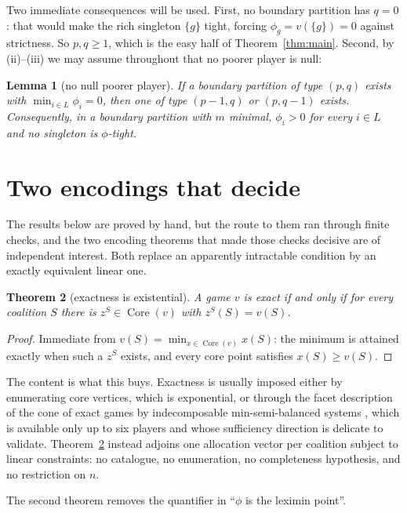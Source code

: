\documentclass[11pt]{article}
\newtheorem{theorem}{Theorem}
\newtheorem{lemma}[theorem]{Lemma}
\newcommand{\core}{\operatorname{Core}}
\begin{document}
Two immediate consequences will be used.  First, no boundary partition has
$q=0$: that would make the rich singleton $\{g\}$ tight, forcing
$\phi_g=v(\{g\})=0$ against strictness.  So $p,q\ge1$, which is the easy half
of Theorem~\ref{thm:main}.  Second, by (ii)--(iii) we may assume throughout
that no poorer player is null:

\begin{lemma}[no null poorer player]\label{lem:nonull}
If a boundary partition of type $(p,q)$ exists with $\min_{i\in L}\phi_i=0$,
then one of type $(p-1,q)$ or $(p,q-1)$ exists.  Consequently, in a boundary
partition with $m$ minimal, $\phi_i>0$ for every $i\in L$ and no singleton is
$\phi$-tight.
\end{lemma}

\section{Two encodings that decide}\label{sec:methods}

The results below are proved by hand, but the route to them ran through finite
checks, and the two encoding theorems that made those checks decisive are of
independent interest.  Both replace an apparently intractable condition by an
exactly equivalent linear one.

\begin{theorem}[exactness is existential]\label{thm:exact}
A game $v$ is exact if and only if for every coalition $S$ there is
$z^S\in\core(v)$ with $z^S(S)=v(S)$.
\end{theorem}

\begin{proof}
Immediate from $v(S)=\min_{x\in\core(v)}x(S)$: the minimum is attained exactly
when such a $z^S$ exists, and every core point satisfies $x(S)\ge v(S)$.
\end{proof}

The content is what this buys.  Exactness is usually imposed either by
enumerating core vertices, which is exponential, or through the facet
description of the cone of exact games by indecomposable min-semi-balanced
systems \citep{StudenyKratochvil2022,LohmannBormHerings2012}, which is
available only up to six players and whose sufficiency direction is delicate to
validate.  Theorem~\ref{thm:exact} instead adjoins one allocation vector per
coalition subject to linear constraints: no catalogue, no enumeration, no
completeness hypothesis, and no restriction on $n$.

The second theorem removes the quantifier in ``$\phi$ is the leximin point''.
\end{document}
